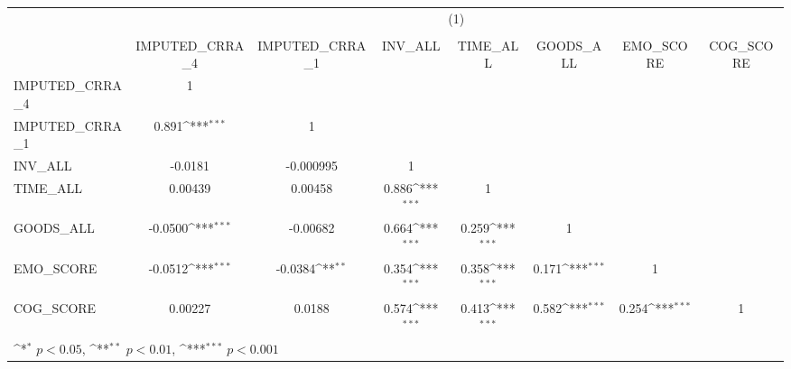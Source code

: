 {
\def\sym#1{\ifmmode^{#1}\else\(^{#1}\)\fi}
\begin{tabular}{l*{7}{c}}
\hline\hline
          &\multicolumn{7}{c}{(1)}                                                                                                             \\
          &\multicolumn{7}{c}{}                                                                                                                \\
          &IMPUTED\_CRRA\_4         &IMPUTED\_CRRA\_1         &  INV\_ALL         & TIME\_ALL         &GOODS\_ALL         &EMO\_SCORE         &COG\_SCORE         \\
\hline
IMPUTED\_CRRA\_4&        1         &                  &                  &                  &                  &                  &                  \\
IMPUTED\_CRRA\_1&    0.891\sym{***}&        1         &                  &                  &                  &                  &                  \\
INV\_ALL   &  -0.0181         &-0.000995         &        1         &                  &                  &                  &                  \\
TIME\_ALL  &  0.00439         &  0.00458         &    0.886\sym{***}&        1         &                  &                  &                  \\
GOODS\_ALL &  -0.0500\sym{***}& -0.00682         &    0.664\sym{***}&    0.259\sym{***}&        1         &                  &                  \\
EMO\_SCORE &  -0.0512\sym{***}&  -0.0384\sym{**} &    0.354\sym{***}&    0.358\sym{***}&    0.171\sym{***}&        1         &                  \\
COG\_SCORE &  0.00227         &   0.0188         &    0.574\sym{***}&    0.413\sym{***}&    0.582\sym{***}&    0.254\sym{***}&        1         \\
\hline\hline
\multicolumn{8}{l}{\footnotesize \sym{*} \(p<0.05\), \sym{**} \(p<0.01\), \sym{***} \(p<0.001\)}\\
\end{tabular}
}
